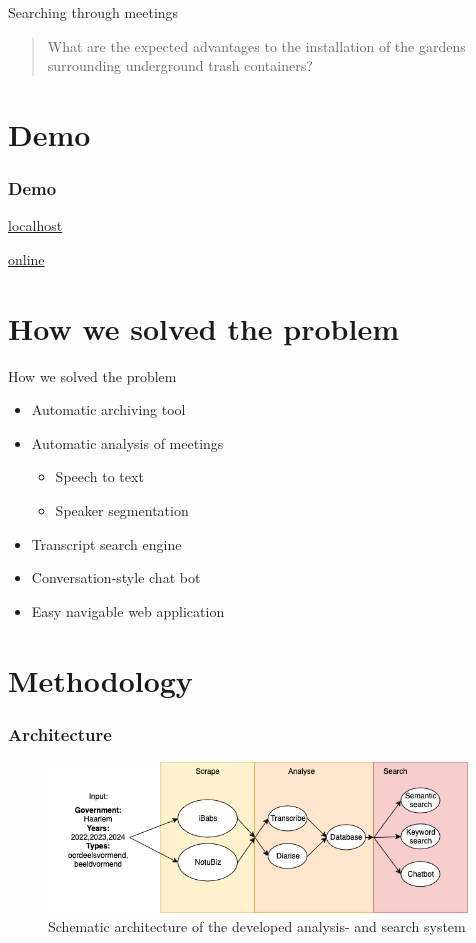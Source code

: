 \documentclass[aspectratio=169,sidebar]{uva-inf-presentation}
\begin{document}
\begin{frame}{Searching through meetings}
    \begin{quote}
        What are the expected advantages to the installation of the gardens surrounding underground trash containers?
    \end{quote}
\end{frame}

\section{Demo}
\begin{frame}\frametitle{Demo}
\href{http://localhost:5173/\#/gemeente/ridderkerk/vergaderingen/2022/986115}{localhost}

\href{https://videotulen.wooverheid.nl/\#/gemeente/ridderkerk/vergaderingen/2022/986115}{online}
\end{frame}

\section{How we solved the problem}
\begin{frame}{How we solved the problem}
    \begin{itemize}
        \item Automatic archiving tool
        \item Automatic analysis of meetings
        \begin{itemize}
            \item Speech to text
            \item Speaker segmentation
        \end{itemize}
        \item Transcript search engine
        \item Conversation-style chat bot
        \item Easy navigable web application
    \end{itemize}
\end{frame}

\section{Methodology}
\begin{frame}\frametitle{Architecture}
\begin{figure}
    \centering
    \includegraphics[width=0.99\textwidth]{images/arch.png}
    \caption{Schematic architecture of the developed analysis- and search system}
    \label{fig:pipeline}
\end{figure}
\end{frame}
\end{document}
